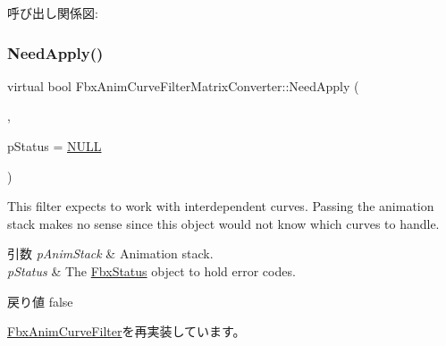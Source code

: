 呼び出し関係図\+:
\mbox{\label{class_fbx_anim_curve_filter_matrix_converter_ad19ed98d377e10fb85c20454dbbadaae}} 
\subsubsection{\texorpdfstring{Need\+Apply()}{NeedApply()}\hspace{0.1cm}{\footnotesize\ttfamily [3/6]}}
{\footnotesize\ttfamily virtual bool Fbx\+Anim\+Curve\+Filter\+Matrix\+Converter\+::\+Need\+Apply (\begin{DoxyParamCaption}\item[{\hyperlink{class_fbx_anim_stack}{Fbx\+Anim\+Stack} $\ast$}]{,  }\item[{\hyperlink{class_fbx_status}{Fbx\+Status} $\ast$}]{p\+Status = {\ttfamily \hyperlink{fbxarch_8h_a070d2ce7b6bb7e5c05602aa8c308d0c4}{N\+U\+LL}} }\end{DoxyParamCaption})\hspace{0.3cm}{\ttfamily [virtual]}}

This filter expects to work with interdependent curves. Passing the animation stack makes no sense since this object would not know which curves to handle. 
\begin{DoxyParams}{引数}
{\em p\+Anim\+Stack} & Animation stack. \\
\hline
{\em p\+Status} & The \hyperlink{class_fbx_status}{Fbx\+Status} object to hold error codes. \\
\hline
\end{DoxyParams}
\begin{DoxyReturn}{戻り値}
{\ttfamily false} 
\end{DoxyReturn}


\hyperlink{class_fbx_anim_curve_filter_af95af2469851b88b4f6d38401ace5791}{Fbx\+Anim\+Curve\+Filter}を再実装しています。

\mbox{\label{class_fbx_anim_curve_filter_matrix_converter_a8f4e811fedfacc4bc5a90942d2a2bfd5}} 

